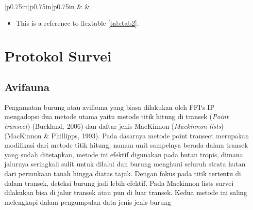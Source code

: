 \documentclass[
]{book}
\providecommand{\tightlist}{%
  \setlength{\itemsep}{0pt}\setlength{\parskip}{0pt}}
\begin{document}
\begin{longtable}[c]{|p{0.75in}|p{0.75in}|p{0.75in}}
 &  &  \\




\end{longtable}

\begin{itemize}
\tightlist
\item
  This is a reference to flextable \ref{tab:tab2}.
\end{itemize}

\hypertarget{protokol-survei}{%
\chapter*{Protokol Survei}\label{protokol-survei}}

\hypertarget{avifauna}{%
\section*{Avifauna}\label{avifauna}}

Pengamatan burung atau avifauna yang biasa dilakukan oleh FFI`s IP mengadopsi dua metode utama yaitu metode titik hitung di transek (\emph{Point transect}) (Buckland, 2006) dan daftar jenis MacKinnon (\emph{Mackinnon lists}) (MacKinnon \& Phillipps, 1993). Pada dasarnya metode point transect merupakan modifikasi dari metode titik hitung, namun unit sampelnya berada dalam transek yang sudah ditetapkan, metode ini efektif digunakan pada hutan tropis, dimana jalurnya seringkali sulit untuk dilalui dan burung menghuni seluruh strata hutan dari permukaan tanah hingga diatas tajuk. Dengan fokus pada titik tertentu di dalam transek, deteksi burung jadi lebih efektif. Pada Mackinnon lists survei dilakukan bisa di jalur transek atau pun di luar transek. Kedua metode ini saling melengkapi dalam pengumpulan data jenis-jenis burung
\end{document}
